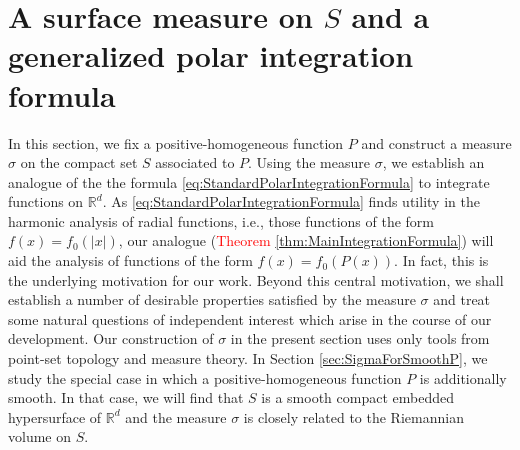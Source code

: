 \documentclass[11pt]{article}
\theoremstyle{theorem}
\begin{document}
\section{A surface measure on $S$ and a generalized polar integration formula}\label{sec:IntegrationFormula}

In this section, we fix a positive-homogeneous function $P$ and construct a measure $\sigma$ on the compact set $S$ associated to $P$. Using the measure $\sigma$, we establish an analogue of the the formula \eqref{eq:StandardPolarIntegrationFormula} to integrate functions on $\mathbb{R}^d$. As \eqref{eq:StandardPolarIntegrationFormula} finds utility in the harmonic analysis of radial functions, i.e., those functions of the form $f(x)=f_0(|x|)$, our analogue (\textcolor{red}{Theorem \ref{thm:MainIntegrationFormula}}) will aid the analysis of functions of the form $f(x)=f_0(P(x))$. In fact, this is the underlying motivation for our work. Beyond this central motivation, we shall establish a number of desirable properties satisfied by the measure $\sigma$ and treat some natural questions of independent interest which arise in the course of our development. Our construction of $\sigma$ in the present section uses only tools from point-set topology and measure theory.  In Section \ref{sec:SigmaForSmoothP}, we study the special case in which a positive-homogeneous function $P$ is additionally smooth. In that case, we will find that $S$ is a smooth compact embedded hypersurface of $\mathbb{R}^d$ and the measure $\sigma$ is closely related to the Riemannian volume on $S$.\\
\end{document}
